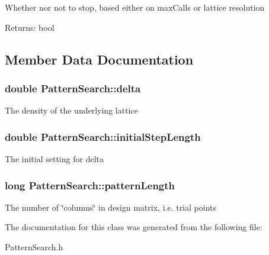 Whether nor not to stop, based either on max\-Calls or lattice resolution \begin{Desc}
\item[Returns:]bool \end{Desc}


\subsection{Member Data Documentation}
\subsubsection{\setlength{\rightskip}{0pt plus 5cm}double {\bf Pattern\-Search::delta}\hspace{0.3cm}{\tt  [protected]}}\label{classPatternSearch_p1}


The density of the underlying lattice 
\subsubsection{\setlength{\rightskip}{0pt plus 5cm}double {\bf Pattern\-Search::initial\-Step\-Length}\hspace{0.3cm}{\tt  [protected]}}\label{classPatternSearch_p2}


The initial setting for delta 
\subsubsection{\setlength{\rightskip}{0pt plus 5cm}long {\bf Pattern\-Search::pattern\-Length}\hspace{0.3cm}{\tt  [protected]}}\label{classPatternSearch_p0}


The number of \char`\"{}columns\char`\"{} in design matrix, i.e. trial points 

The documentation for this class was generated from the following file:\begin{CompactItemize}
\item 
Pattern\-Search.h\end{CompactItemize}
